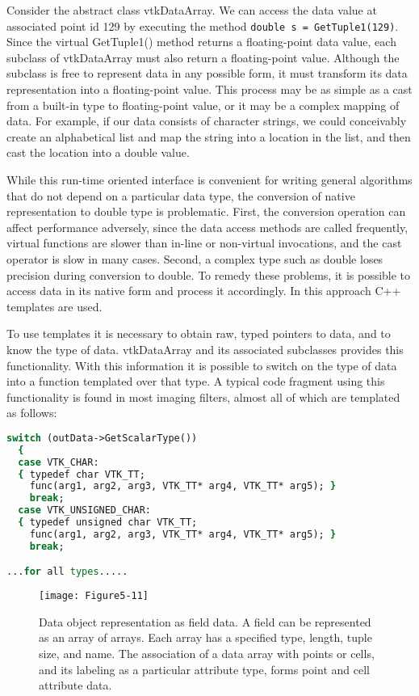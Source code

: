 Consider the abstract class vtkDataArray. We can access the data value at associated point id 129 by executing the method \texttt{double s = GetTuple1(129)}. Since the virtual GetTuple1() method returns a floating-point data value, each subclass of vtkDataArray must also return a floating-point value. Although the subclass is free to represent data in any possible form, it must transform its data representation into a floating-point value. This process may be as simple as a cast from a built-in type to floating-point value, or it may be a complex mapping of data. For example, if our data consists of character strings, we could conceivably create an alphabetical list and map the string into a location in the list, and then cast the location into a double value.

While this run-time oriented interface is convenient for writing general algorithms that do not depend on a particular data type, the conversion of native representation to double type is problematic. First, the conversion operation can affect performance adversely, since the data access methods are called frequently, virtual functions are slower than in-line or non-virtual invocations, and the cast operator is slow in many cases. Second, a complex type such as double loses precision during conversion to double. To remedy these problems, it is possible to access data in its native form and process it accordingly. In this approach C++ templates are used.

To use templates it is necessary to obtain raw, typed pointers to data, and to know the type of data. vtkDataArray and its associated subclasses provides this functionality. With this information it is possible to switch on the type of data into a function templated over that type. A typical code fragment using this functionality is found in most imaging filters, almost all of which are templated as follows:

\begin{lstlisting}[language=TCL, caption={Obtaining raw typed pointers to data.}]
switch (outData->GetScalarType())
  {
  case VTK_CHAR:
  { typedef char VTK_TT;
    func(arg1, arg2, arg3, VTK_TT* arg4, VTK_TT* arg5); }
    break;
  case VTK_UNSIGNED_CHAR:
  { typedef unsigned char VTK_TT;
    func(arg1, arg2, arg3, VTK_TT* arg4, VTK_TT* arg5); }
    break;

...for all types.....

\end{lstlisting}

\begin{figure}[!htb]
	\centering
	\texttt{[image: Figure5-11]}
	\caption{Data object representation as field data. A field can be represented as an array of arrays. Each array has a specified type, length, tuple size, and name. The association of a data array with points or cells, and its labeling as a particular attribute type, forms point and cell attribute data.}
	\label{fig:Figure5-11}
\end{figure}

